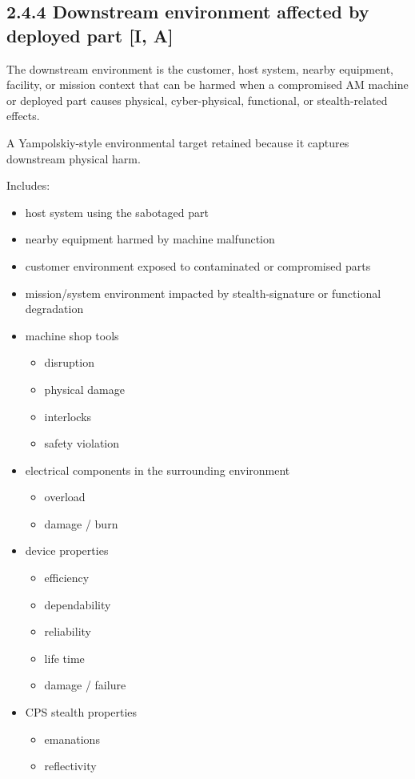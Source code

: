 \documentclass[10pt,a4paper,oneside]{report}
\begin{document}
\subsection{2.4.4 Downstream environment affected by deployed part [I, A]}


The downstream environment is the customer, host system, nearby equipment, facility, or mission context that can be harmed when a compromised AM machine or deployed part causes physical, cyber-physical, functional, or stealth-related effects.

A Yampolskiy-style environmental target retained because it captures downstream physical harm.

Includes:

\begin{itemize}
\item host system using the sabotaged part
\item nearby equipment harmed by machine malfunction
\item customer environment exposed to contaminated or compromised parts
\item mission/system environment impacted by stealth-signature or functional degradation
\item machine shop tools
\begin{itemize}
\item disruption
\item physical damage
\item interlocks
\item safety violation
\end{itemize}
\item electrical components in the surrounding environment
\begin{itemize}
\item overload
\item damage / burn
\end{itemize}
\item device properties
\begin{itemize}
\item efficiency
\item dependability
\item reliability
\item life time
\item damage / failure
\end{itemize}
\item CPS stealth properties
\begin{itemize}
\item emanations
\item reflectivity
\end{itemize}
\end{itemize}
\end{document}
